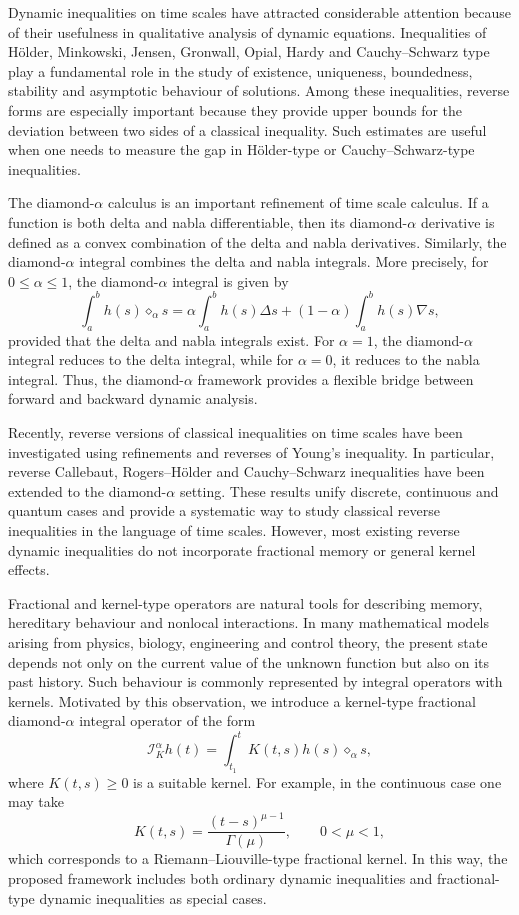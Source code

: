 \documentclass[11pt]{article}
\begin{document}
Dynamic inequalities on time scales have attracted considerable attention because of their usefulness in qualitative analysis of dynamic equations. Inequalities of H\"older, Minkowski, Jensen, Gronwall, Opial, Hardy and Cauchy--Schwarz type play a fundamental role in the study of existence, uniqueness, boundedness, stability and asymptotic behaviour of solutions. Among these inequalities, reverse forms are especially important because they provide upper bounds for the deviation between two sides of a classical inequality. Such estimates are useful when one needs to measure the gap in H\"older-type or Cauchy--Schwarz-type inequalities.

The diamond-$\alpha$ calculus is an important refinement of time scale calculus. If a function is both delta and nabla differentiable, then its diamond-$\alpha$ derivative is defined as a convex combination of the delta and nabla derivatives. Similarly, the diamond-$\alpha$ integral combines the delta and nabla integrals. More precisely, for $0\leq \alpha \leq 1$, the diamond-$\alpha$ integral is given by
\[
\int_{a}^{b} h(s)\diamond_{\alpha}s
=
\alpha\int_{a}^{b}h(s)\Delta s
+
(1-\alpha)\int_{a}^{b}h(s)\nabla s,
\]
provided that the delta and nabla integrals exist. For $\alpha=1$, the diamond-$\alpha$ integral reduces to the delta integral, while for $\alpha=0$, it reduces to the nabla integral. Thus, the diamond-$\alpha$ framework provides a flexible bridge between forward and backward dynamic analysis.

Recently, reverse versions of classical inequalities on time scales have been investigated using refinements and reverses of Young's inequality. In particular, reverse Callebaut, Rogers--H\"older and Cauchy--Schwarz inequalities have been extended to the diamond-$\alpha$ setting. These results unify discrete, continuous and quantum cases and provide a systematic way to study classical reverse inequalities in the language of time scales. However, most existing reverse dynamic inequalities do not incorporate fractional memory or general kernel effects.

Fractional and kernel-type operators are natural tools for describing memory, hereditary behaviour and nonlocal interactions. In many mathematical models arising from physics, biology, engineering and control theory, the present state depends not only on the current value of the unknown function but also on its past history. Such behaviour is commonly represented by integral operators with kernels. Motivated by this observation, we introduce a kernel-type fractional diamond-$\alpha$ integral operator of the form
\[
\mathcal{I}_{K}^{\alpha}h(t)
=
\int_{t_{1}}^{t}K(t,s)h(s)\diamond_{\alpha}s,
\]
where $K(t,s)\geq 0$ is a suitable kernel. For example, in the continuous case one may take
\[
K(t,s)=\frac{(t-s)^{\mu-1}}{\Gamma(\mu)},\qquad 0<\mu<1,
\]
which corresponds to a Riemann--Liouville-type fractional kernel. In this way, the proposed framework includes both ordinary dynamic inequalities and fractional-type dynamic inequalities as special cases.
\end{document}

